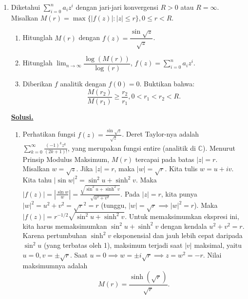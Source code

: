 \documentclass[12pt,twoside]{article}
\newenvironment{solution}
{
	\par\noindent\textbf{\underline{Solusi.}}\\
}
{
	\par
}
\begin{document}
\begin{enumerate}
  \item Diketahui $\displaystyle \sum_{i=0}^{n}a_iz^i$ dengan jari-jari konvergensi $R>0$ atau $R=\infty$.\\ Misalkan $M(r)=\max\{|f(z)|:|z|\leq r \},0\leq r<R$.
        \begin{enumerate}
          \item [(a)] Hitunglah $M(r)$ dengan $f(z)=\dfrac{\sin \sqrt{z}}{\sqrt{z}}$.
          \item[(b)] Hitunglah $\displaystyle \lim_{n\to\infty}\dfrac{\log\left(M(r)\right)}{\log(r)}$, $f(z)=\displaystyle\sum_{i=0}^{n}a_iz^i$.
          \item[(c)] Diberikan $f$ analitik dengan $f(0)=0$. Buktikan bahwa:$$\dfrac{M(r_2)}{M(r_1)}\geq \dfrac{r_2}{r_1},0<r_1<r_2<R.$$
        \end{enumerate}
        \begin{solution}
          \begin{enumerate}
            \item[(a)] Perhatikan fungsi $f(z) = \frac{\sin \sqrt{z}}{\sqrt{z}}$. Deret Taylor-nya adalah $\sum_{k=0}^\infty \frac{(-1)^k z^k}{(2k+1)!}$, yang merupakan fungsi entire (analitik di $\mathbb{C}$).
                  Menurut Prinsip Modulus Maksimum, $M(r)$ tercapai pada batas $|z|=r$.
                  Misalkan $w = \sqrt{z}$. Jika $|z|=r$, maka $|w|=\sqrt{r}$. Kita tulis $w = u+iv$.
                  Kita tahu $|\sin w|^2 = \sin^2 u + \sinh^2 v$.
                  Maka $|f(z)| = \left|\frac{\sin w}{w}\right| = \frac{\sqrt{\sin^2 u + \sinh^2 v}}{\sqrt{u^2+v^2}}$.
                  Pada $|z|=r$, kita punya $|w|^2 = u^2+v^2 = \sqrt{r}^2 = r$ (tunggu, $|w|=\sqrt{r} \implies |w|^2=r$).
                  Maka $|f(z)| = r^{-1/2} \sqrt{\sin^2 u + \sinh^2 v}$.
                  Untuk memaksimumkan ekspresi ini, kita harus memaksimumkan $\sin^2 u + \sinh^2 v$ dengan kendala $u^2+v^2 = r$.
                  Karena pertumbuhan $\sinh^2 v$ eksponensial dan jauh lebih cepat daripada $\sin^2 u$ (yang terbatas oleh 1), maksimum terjadi saat $|v|$ maksimal, yaitu $u=0, v=\pm \sqrt{r}$.
                  Saat $u=0 \implies w = \pm i\sqrt{r} \implies z=w^2=-r$.
                  Nilai maksimumnya adalah
                  $$ M(r) = \frac{\sinh(\sqrt{r})}{\sqrt{r}}. $$


\end{enumerate}
\end{solution}
\end{enumerate}
\end{document}
